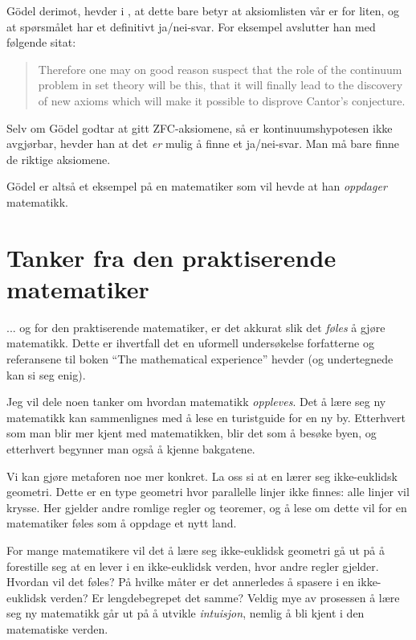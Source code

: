\documentclass[12pt, norsk]{article}
\begin{document}
Gödel derimot, hevder i \cite{godel_continuum}, at dette bare betyr at aksiomlisten vår er for liten, og at spørsmålet har et definitivt ja/nei-svar. For eksempel avslutter han med følgende sitat:

\begin{quote}
Therefore one may on good reason suspect that the role of the continuum problem in set theory will be this, that it will finally lead to the discovery of new axioms which will make it possible to disprove Cantor's conjecture.
\end{quote}

Selv om Gödel godtar at gitt ZFC-aksiomene, så er kontinuumshypotesen ikke avgjørbar, hevder han at det \emph{er} mulig å finne et ja/nei-svar. Man må bare finne de riktige aksiomene. 

Gödel er altså et eksempel på en matematiker som vil hevde at han \emph{oppdager} matematikk.


\section{Tanker fra den praktiserende matematiker}

... og for den praktiserende matematiker, er det akkurat slik det \emph{føles} å gjøre matematikk. Dette er ihvertfall det en uformell undersøkelse forfatterne og referansene til boken ``The mathematical experience'' \cite{mathematical_experience} hevder (og undertegnede kan si seg enig). 

Jeg vil dele noen tanker om hvordan matematikk \emph{oppleves}. Det å lære seg ny matematikk kan sammenlignes med å lese en turistguide for en ny by. Etterhvert som man blir mer kjent med matematikken, blir det som å besøke byen, og etterhvert begynner man også å kjenne bakgatene.

Vi kan gjøre metaforen noe mer konkret. La oss si at en lærer seg ikke-euklidsk geometri. Dette er en type geometri hvor parallelle linjer ikke finnes: alle linjer vil krysse. Her gjelder andre romlige regler og teoremer, og å lese om dette vil for en matematiker føles som å oppdage et nytt land.

For mange matematikere vil det å lære seg ikke-euklidsk geometri gå ut på å forestille seg at en lever i en ikke-euklidsk verden, hvor andre regler gjelder. Hvordan vil det føles? På hvilke måter er det annerledes å spasere i en ikke-euklidsk verden? Er lengdebegrepet det samme? Veldig mye av prosessen å lære seg ny matematikk går ut på å utvikle \emph{intuisjon}, nemlig å bli kjent i den matematiske verden. 
\end{document}

